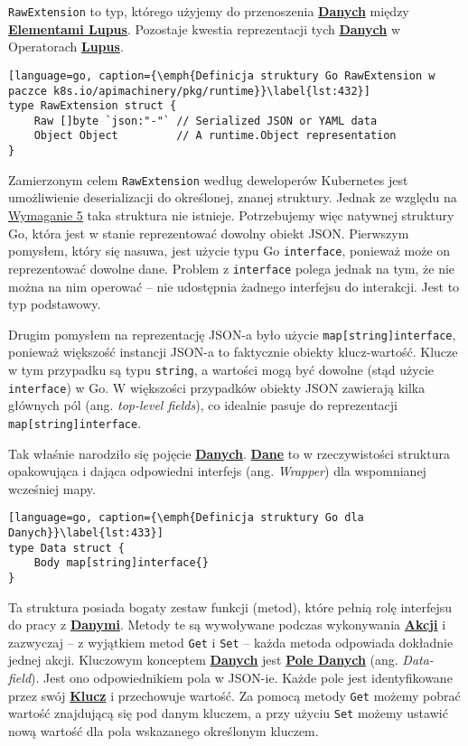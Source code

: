 \texttt{RawExtension} to typ, którego użyjemy do przenoszenia \hyperlink{def:dane}{\textbf{Danych}} między \hyperlink{def:element-lupus}{\textbf{Elementami Lupus}}. Pozostaje kwestia reprezentacji tych \hyperlink{def:dane}{\textbf{Danych}} w Operatorach \hyperlink{def:lupus}{\textbf{Lupus}}. 

\begin{lstlisting}[language=go, caption={\emph{Definicja struktury Go RawExtension w paczce k8s.io/apimachinery/pkg/runtime}}\label{lst:432}]
type RawExtension struct {
    Raw []byte `json:"-"` // Serialized JSON or YAML data
    Object Object         // A runtime.Object representation
}
\end{lstlisting}

Zamierzonym celem \texttt{RawExtension} według deweloperów Kubernetes jest umożliwienie deserializacji do określonej, znanej struktury. Jednak ze względu na \hyperref[req:5]{Wymaganie 5} taka struktura nie istnieje. Potrzebujemy więc natywnej struktury Go, która jest w stanie reprezentować dowolny obiekt JSON. Pierwszym pomysłem, który się nasuwa, jest użycie typu Go \texttt{interface{}}, ponieważ może on reprezentować dowolne dane. Problem z \texttt{interface{}} polega jednak na tym, że nie można na nim operować – nie udostępnia żadnego interfejsu do interakcji. Jest to typ podstawowy.

Drugim pomysłem na reprezentację JSON-a było użycie \texttt{map[string]interface{}}, ponieważ większość instancji JSON-a to faktycznie obiekty klucz-wartość. Klucze w tym przypadku są typu \texttt{string}, a wartości mogą być dowolne (stąd użycie \texttt{interface{}}) w Go. W większości przypadków obiekty JSON zawierają kilka głównych pól (ang. \textit{top-level fields}), co idealnie pasuje do reprezentacji \texttt{map[string]interface{}}.

Tak właśnie narodziło się pojęcie \hyperlink{def:dane}{\textbf{Danych}}. \hyperlink{def:dane}{\textbf{Dane}} to w rzeczywistości struktura opakowująca i dająca odpowiedni interfejs (ang. \textit{Wrapper}) dla wspomnianej wcześniej mapy.

\begin{lstlisting}[language=go, caption={\emph{Definicja struktury Go dla Danych}}\label{lst:433}]
type Data struct {
	Body map[string]interface{}
}
\end{lstlisting}

Ta struktura posiada bogaty zestaw funkcji (metod), które pełnią rolę interfejsu do pracy z \hyperlink{def:dane}{\textbf{Danymi}}. Metody te są wywoływane podczas wykonywania \hyperlink{def:akcja}{\textbf{Akcji}} i zazwyczaj – z wyjątkiem metod \texttt{Get} i \texttt{Set} – każda metoda odpowiada dokładnie jednej akcji. Kluczowym konceptem \hyperlink{def:dane}{\textbf{Danych}} jest \hyperlink{def:pole-danych}{\textbf{Pole Danych}} (ang. \textit{Data-field}). Jest ono odpowiednikiem pola w JSON-ie. Każde pole jest identyfikowane przez swój \hyperlink{def:klucz}{\textbf{Klucz}} i przechowuje wartość. Za pomocą metody \texttt{Get} możemy pobrać wartość znajdującą się pod danym kluczem, a przy użyciu \texttt{Set} możemy ustawić nową wartość dla pola wskazanego określonym kluczem. 


